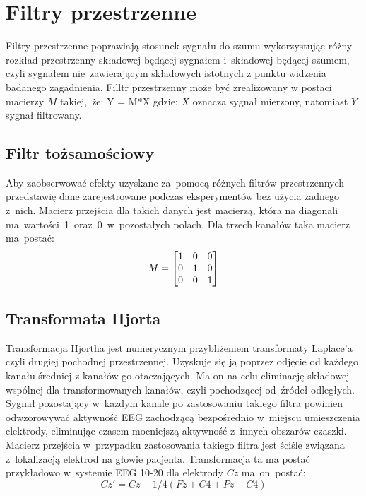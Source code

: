 \documentclass[licencjacka,openright]{pracamgr}
\begin{document}
\section{Filtry przestrzenne}
Filtry przestrzenne poprawiają stosunek sygnału do szumu wykorzystując różny rozkład przestrzenny składowej będącej sygnałem i~składowej będącej szumem, czyli sygnałem nie~zawierającym składowych istotnych z punktu widzenia badanego zagadnienia.
Filltr przestrzenny może być zrealizowany w postaci macierzy $M$ takiej,~że: 
Y = M*X
gdzie: $X$ oznacza sygnał mierzony, natomiast $Y$ sygnał filtrowany.


\subsection{Filtr tożsamościowy}
Aby zaobserwować efekty uzyskane za~pomocą różnych filtrów przestrzennych przedstawię dane zarejestrowane podczas eksperymentów bez użycia żadnego z~nich. Macierz przejścia dla takich danych jest macierzą, która na diagonali ma~wartości~1~oraz~0~w~pozostałych polach.
Dla trzech kanałów taka macierz ma~postać:
\[
M =
\begin{bmatrix}
  $1$ & $0$ & $0$ \\
  $0$ & $1$ & $0$ \\
  $0$ & $0$ & $1$ 
\end{bmatrix}
\]

\subsection{Transformata Hjorta}
Transformacja Hjortha jest numerycznym przybliżeniem transformaty Laplace'a czyli drugiej pochodnej przestrzennej. Uzyskuje się ją poprzez odjęcie od każdego kanału średniej z kanałów go otaczających. Ma on na celu eliminację składowej wspólnej dla transformowanych kanałów, czyli pochodzącej od~źródeł odległych. Sygnał pozostający w~każdym kanale po zastosowaniu takiego filtra powinien odwzorowywać aktywność EEG zachodzącą bezpośrednio w~miejscu umieszczenia elektrody, eliminując czasem mocniejszą aktywność z~innych obszarów czaszki.
Macierz przejścia w~przypadku zastosowania takiego filtra jest ściśle związana z~lokalizacją elektrod na głowie pacjenta.
Transformacja ta ma postać przykładowo w~systemie EEG 10-20 dla elektrody $Cz$ ma~on~postać:
\begin{equation}
Cz' = Cz - 1/4(Fz+C4+Pz+C4)
\end{equation}
\end{document}
